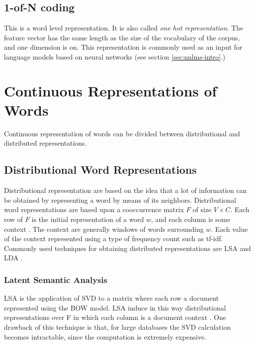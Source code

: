  \subsection{1-of-N coding}
 \label{sec:1_of_coding}

 This is a word level representation. It is also called \textit{one hot
   representation}. The feature vector has the same length as the size of the
 vocabulary of the corpus, and  one dimension is on.  This representation is
 commonly used as an input for language models based on neural networks (see
 section \ref{sec:nnlms-intro}.)


 \section{Continuous Representations of Words}

\label{sec:sub_continuous_representation}
 Continuous representation  of words  can be divided between distributional and
 distributed representations. 

\subsection{Distributional Word Representations}

Distributional representation are based on the idea that a lot of
information can be obtained by representing a word by means of its neighbors.
Distributional word representations are based 
upon a cooccurrence matrix $F$ of size $V \times C$.  Each row of $F$ is the
initial representation of a word $w$, and each column is some context
\cite{Turian:2010:WRS:1858681.1858721}. The context  are generally windows of
 words surrounding $w$. Each value of the context  represented using a type of
frequency count such as \ac{tf-idf}. Commonly used techniques for obtaining distributed
representations  are \ac{LSA} \cite{Dumais:1988:ULS:57167.57214} and \ac{LDA}
\cite{Blei:2003:LDA:944919.944937}.


 \subsubsection{Latent Semantic Analysis}
 \label{sec:rel_sa}
\ac{LSA} is the application of \ac{SVD} to a matrix where each row a document
represented using the \ac{BOW} model.
 \ac{LSA} induce in this way  distributional representations over F in which
each column is a document context \cite{Turian:2010:WRS:1858681.1858721}.  
One drawback of this technique is that,  for large databases the SVD
calculation becomes intractable, since the computation is extremely
expensive.

